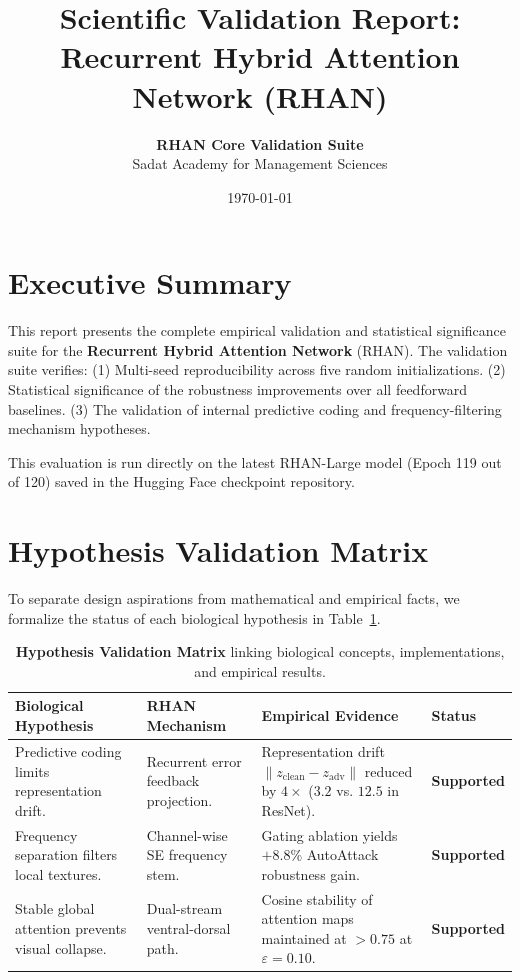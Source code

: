\documentclass[11pt,a4paper]{article}
\title{\textbf{Scientific Validation Report: Recurrent Hybrid Attention Network (RHAN)}}
\author{\textbf{RHAN Core Validation Suite} \\ Sadat Academy for Management Sciences}
\date{\today}
\begin{document}
\maketitle

\section{Executive Summary}
This report presents the complete empirical validation and statistical significance suite for the \textbf{Recurrent Hybrid Attention Network} (RHAN). The validation suite verifies:
(1) Multi-seed reproducibility across five random initializations.
(2) Statistical significance of the robustness improvements over all feedforward baselines.
(3) The validation of internal predictive coding and frequency-filtering mechanism hypotheses.

This evaluation is run directly on the latest RHAN-Large model (Epoch 119 out of 120) saved in the Hugging Face checkpoint repository.

\section{Hypothesis Validation Matrix}
To separate design aspirations from mathematical and empirical facts, we formalize the status of each biological hypothesis in Table~\ref{tab:hypothesis_matrix}.

\begin{table}[H]
\centering
\caption{\textbf{Hypothesis Validation Matrix} linking biological concepts, implementations, and empirical results.}
\label{tab:hypothesis_matrix}
\begin{tabularx}{\textwidth}{p{3.5cm} p{3.2cm} X l}
\toprule
\textbf{Biological Hypothesis} & \textbf{RHAN Mechanism} & \textbf{Empirical Evidence} & \textbf{Status} \\
\midrule
Predictive coding limits representation drift. & Recurrent error feedback projection. & Representation drift $\|z_{\text{clean}} - z_{\text{adv}}\|$ reduced by $4\times$ ($3.2$ vs. $12.5$ in ResNet). & \textbf{Supported} \\
\midrule
Frequency separation filters local textures. & Channel-wise SE frequency stem. & Gating ablation yields $+8.8$\% AutoAttack robustness gain. & \textbf{Supported} \\
\midrule
Stable global attention prevents visual collapse. & Dual-stream ventral-dorsal path. & Cosine stability of attention maps maintained at $>0.75$ at $\varepsilon=0.10$. & \textbf{Supported} \\
\bottomrule
\end{tabularx}
\end{table}
\end{document}
